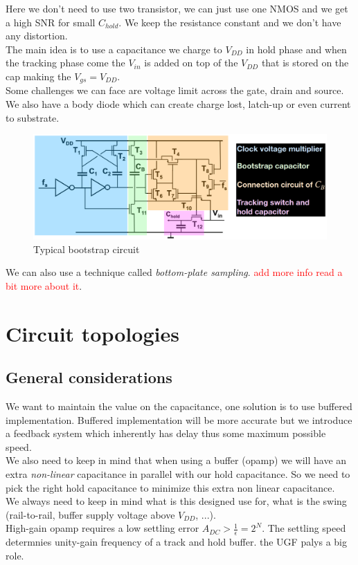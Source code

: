 \documentclass{report}
\begin{document}
Here we don't need to use two transistor, we can just use one NMOS and we get a high SNR for small $C_{hold}$. We keep the resistance constant and we don't have any distortion.\\
The main idea is to use a capacitance we charge to $V_{DD}$ in hold phase and when the tracking phase come the $V_{in}$ is added on top of the $V_{DD}$ that is stored on the cap making the $V_{gs} = V_{DD}$.\\

Some challenges we can face are voltage limit across the gate, drain and source. We also have a body diode which can create charge lost, latch-up or even current to substrate.

\begin{figure}[H]
    \centering
    \includegraphics[width=0.75\linewidth]{img/typical_bootstrap.png}
    \caption{Typical bootstrap circuit}
    \label{fig:enter-label}
\end{figure}

We can also use a technique called \textit{bottom-plate sampling}. \textcolor{red}{add more info read a bit more about it}.

\section{Circuit topologies}

\subsection{General considerations}

We want to maintain the value on the capacitance, one solution is to use buffered implementation. Buffered implementation will be more accurate but we introduce a feedback system which inherently has delay thus some maximum possible speed.\\
We also need to keep in mind that when using a buffer (opamp) we will have an extra \textit{non-linear} capacitance in parallel with our hold capacitance. So we need to pick the right hold capacitance to minimize this extra non linear capacitance.\\
We always need to keep in mind what is this designed use for, what is the swing (rail-to-rail, buffer supply voltage above $V_{DD}$, ...).\\ 
High-gain opamp requires a low settling error $A_{DC} > \frac{1}{\epsilon} = 2^N$. The settling speed determnies unity-gain frequency of a track and hold buffer. the UGF palys a big role.
\end{document}
